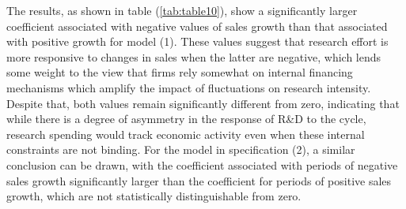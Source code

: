 \documentclass{_latex/house}
\begin{document}
The results, as shown in table (\ref{tab:table10}), show a significantly larger coefficient associated with negative values of sales growth than that associated with positive growth for model (1). These values suggest that research effort is more responsive to changes in sales when the latter are negative, which lends some weight to the view that firms rely somewhat on internal financing mechanisms which amplify the impact of fluctuations on research intensity. Despite that, both values remain significantly different from zero, indicating that while there is a degree of asymmetry in the response of R\&D to the cycle, research spending would track economic activity even when these internal constraints are not binding. For the model in specification (2), a similar conclusion can be drawn, with the coefficient associated with periods of negative sales growth significantly larger than the coefficient for periods of positive sales growth, which are not statistically distinguishable from zero.
\newpage
\end{document}
